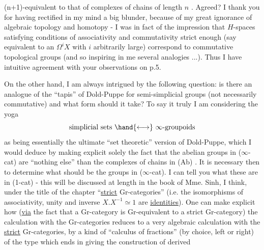 
(n+1)-equivalent to that of complexes of chains of length $n$ .
Agreed?  I thank you for having rectified in my mind a big blunder,
because of my great ignorance of algebraic topology and homotopy -
I was in fact of the impression that $H$-spaces satisfying conditions
of associativity and commutativity strict enough (say equivalent
to an $\Omega^{i}X$ with $i$ arbitrarily large) correspond to commutative
topological groups (and so inspiring in me several analogies ...).
Thus I have intuitive agreement with your observations on p.5.

On the other hand, I am always intrigued by the following
question: is there an analogue of the ``tapis'' of Dold-Puppe for
semi-simplicial groups (not necessarily commutative) and what form
should it take?  To say it truly I am considering the yoga
\[ \text{simplicial sets } \hand{\longleftrightarrow} \ \infty\text{-groupoids} \]
as being essentially the ultimate ``set theoretic'' version of
Dold-Puppe, which I would deduce by making explicit solely the
fact that the abelian groups in  ($\infty$-cat) are ``nothing else'' than
the complexes of chains in  (Ab) .  It is necessary then to
determine what should be the groups in ($\infty$-cat). I can tell you what
these are in (1-cat) - this will be discussed at length in the book
of Mme. Sinh, I think, under the title of the chapter ``\uline{strict}
Gr-categories'' (i.e. the isomorphisms of associativity, unity and
inverse  $X.X^{-1} \simeq 1$  are \uline{identities}).  One can make explicit how
(\uline{via} the fact that a Gr-category is Gr-equivalent to a strict
Gr-category)      the calculation with the Gr-categories reduces
to a very algebraic calculation with the \uline{strict} Gr-categories,
by a kind of ``calculus of fractions'' (by choice, left or right)
of the type which ends in giving the construction of derived

